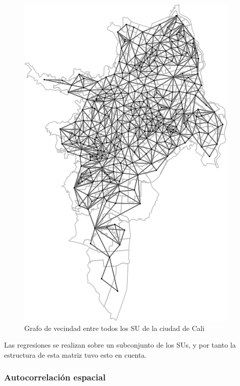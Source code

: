 \documentclass[12pt,a4paper,openany]{book}
\theoremstyle{definition}
\theoremstyle{definition}
\theoremstyle{definition}
\theoremstyle{remark}
\begin{document}
\begin{figure}

{\centering \includegraphics[width=1\linewidth]{tesis-unigis_files/figure-latex/w-su-todos-1} 

}

\caption{Grafo de vecindad entre todos los SU de la ciudad de Cali}\label{fig:w-su-todos}
\end{figure}

Las regresiones se realizan sobre un subconjunto de los SUs, y por tanto
la estructura de esta matriz tuvo esto en cuenta.

\subsubsection{Autocorrelación espacial}\label{autocorrelacion-espacial}
\end{document}

